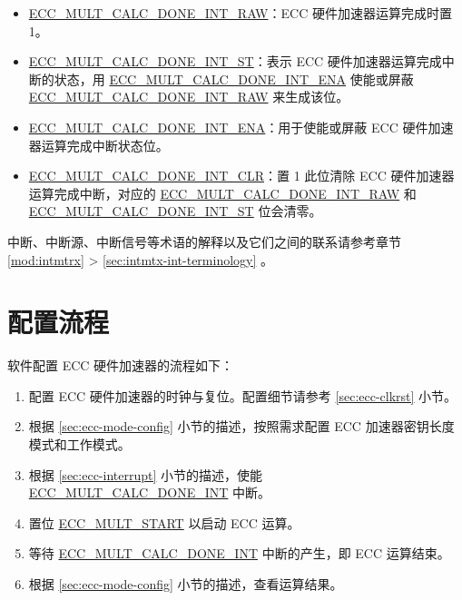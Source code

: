 \documentclass[main\_\_CN.tex]{subfiles}
\begin{document}
\begin{itemize}
    \item \hyperref[fielddesc:ECCMULTCALCDONEINTRAW]{ECC\_MULT\_CALC\_DONE\_INT\_RAW}：ECC 硬件加速器运算完成时置 1。
    \item \hyperref[fielddesc:ECCMULTCALCDONEINTST]{ECC\_MULT\_CALC\_DONE\_INT\_ST}：表示 ECC 硬件加速器运算完成中断的状态，用 \hyperref[fielddesc:ECCMULTCALCDONEINTENA]{ECC\_MULT\_CALC\_DONE\_INT\_ENA} 使能或屏蔽 \hyperref[fielddesc:ECCMULTCALCDONEINTRAW]{ECC\_MULT\_CALC\_DONE\_INT\_RAW} 来生成该位。
    \item \hyperref[fielddesc:ECCMULTCALCDONEINTENA]{ECC\_MULT\_CALC\_DONE\_INT\_ENA}：用于使能或屏蔽 ECC 硬件加速器运算完成中断状态位。
    \item \hyperref[fielddesc:ECCMULTCALCDONEINTCLR]{ECC\_MULT\_CALC\_DONE\_INT\_CLR}：置 1 此位清除 ECC 硬件加速器运算完成中断，对应的 \hyperref[fielddesc:ECCMULTCALCDONEINTRAW]{ECC\_MULT\_CALC\_DONE\_INT\_RAW} 和 \hyperref[fielddesc:ECCMULTCALCDONEINTST]{ECC\_MULT\_CALC\_DONE\_INT\_ST} 位会清零。
\end{itemize}

\begin{tiplisting}
中断、中断源、中断信号等术语的解释以及它们之间的联系请参考章节 \ref{mod:intmtrx} \textit{} > \ref{sec:intmtx-int-terminology} \textit{}。
\end{tiplisting}



\section{配置流程}

软件配置 ECC 硬件加速器的流程如下：

\begin{enumerate}
    \item 配置 ECC 硬件加速器的时钟与复位。配置细节请参考 \ref{sec:ecc-clkrst} 小节。
    \item 根据 \ref{sec:ecc-mode-config} 小节的描述，按照需求配置 ECC 加速器密钥长度模式和工作模式。
    \item 根据 \ref{sec:ecc-interrupt} 小节的描述，使能 \hyperref[int:ECCMULTCALCDONEINT]{ECC\_MULT\_CALC\_DONE\_INT} 中断。
    \item 置位 \hyperref[fielddesc:ECCMULTSTART]{ECC\_MULT\_START} 以启动 ECC 运算。
    \item 等待 \hyperref[int:ECCMULTCALCDONEINT]{ECC\_MULT\_CALC\_DONE\_INT} 中断的产生，即 ECC 运算结束。
    \item 根据 \ref{sec:ecc-mode-config} 小节的描述，查看运算结果。
\end{enumerate}
\end{document}
